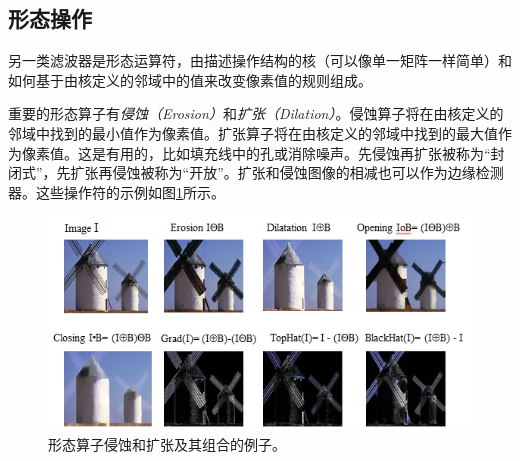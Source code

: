 \subsection{形态操作}
另一类滤波器是形态运算符，由描述操作结构的核（可以像单一矩阵一样简单）和如何基于由核定义的邻域中的值来改变像素值的规则组成。


重要的形态算子有\emph{侵蚀（Erosion）}和\emph{扩张（Dilation）}。侵蚀算子将在由核定义的邻域中找到的最小值作为像素值。扩张算子将在由核定义的邻域中找到的最大值作为像素值。这是有用的，比如填充线中的孔或消除噪声。先侵蚀再扩张被称为“封闭式”，先扩张再侵蚀被称为“开放”。扩张和侵蚀图像的相减也可以作为边缘检测器。这些操作符的示例如图\ref{fig:morphology}所示。


\begin{figure}
	\centering
		\includegraphics[width=\textwidth]{figs/morphology}
	\caption{形态算子侵蚀和扩张及其组合的例子。
	\label{fig:morphology}}
\end{figure}


